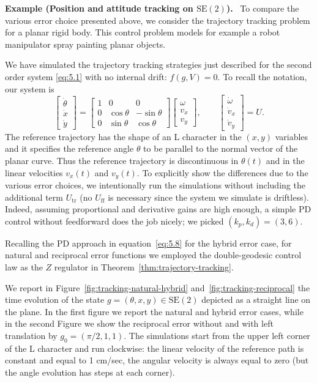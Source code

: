 \documentclass[11pt]{article}
\newcommand{\SE}{\mathrm{SE}}
\newcounter{paperexample}
\renewcommand{\thepaperexample}{\arabic{paperexample}}
\newcommand{\paperexample}[2]{\refstepcounter{paperexample}\par\medskip\noindent\textbf{Example \thepaperexample#1.}\label{#2}\ }
\begin{document}
\paperexample{ (Position and attitude tracking on $\SE(2)$)}{ex:se2-tracking} To compare the various error choice presented above, we consider the trajectory tracking problem for a planar rigid body. This control problem models for example a robot manipulator spray painting planar objects.

We have simulated the trajectory tracking strategies just described for the second order system \eqref{eq:5.1} with no internal drift: $f(g,V)=0$. To recall the notation, our system is
\begin{equation*}
\begin{bmatrix}\dot\theta\\\dot x\\\dot y\end{bmatrix}
=\begin{bmatrix}1&0&0\\0&\cos\theta&-\sin\theta\\0&\sin\theta&\cos\theta\end{bmatrix}
\begin{bmatrix}\omega\\v_x\\v_y\end{bmatrix},
\qquad
\begin{bmatrix}\dot\omega\\\dot v_x\\\dot v_y\end{bmatrix}=U.
\end{equation*}
The reference trajectory has the shape of an L character in the $(x,y)$ variables and it specifies the reference angle $\theta$ to be parallel to the normal vector of the planar curve. Thus the reference trajectory is discontinuous in $\theta(t)$ and in the linear velocities $v_x(t)$ and $v_y(t)$. To explicitly show the differences due to the various error choices, we intentionally run the simulations without including the additional term $U_{\mathrm{tr}}$ (no $U_{\mathrm{ff}}$ is necessary since the system we simulate is driftless). Indeed, assuming proportional and derivative gains are high enough, a simple PD control without feedforward does the job nicely; we picked $(k_p,k_d)=(3,6)$.

Recalling the PD approach in equation~\eqref{eq:5.8} for the hybrid error case, for natural and reciprocal error functions we employed the double-geodesic control law as the $Z$ regulator in Theorem~\ref{thm:trajectory-tracking}.

We report in Figure~\ref{fig:tracking-natural-hybrid} and~\ref{fig:tracking-reciprocal} the time evolution of the state $g=(\theta,x,y)\in\SE(2)$ depicted as a straight line on the plane. In the first figure we report the natural and hybrid error cases, while in the second Figure we show the reciprocal error without and with left translation by $g_0=(\pi/2,1,1)$. The simulations start from the upper left corner of the L character and run clockwise: the linear velocity of the reference path is constant and equal to 1 cm/sec, the angular velocity is always equal to zero (but the angle evolution has steps at each corner).
\end{document}
